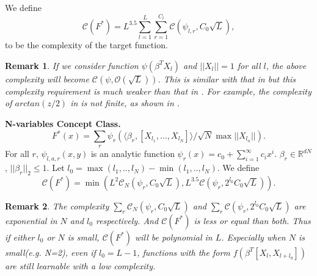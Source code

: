 \documentclass{article}
\newcommand{\cO}{\mathcal{O}}
\newtheorem{rem}{\textbf{Remark}}[section]
\begin{document}
We define
\begin{equation}\label{com1}
\mathscr{C}(F^*)=L^{3.5}\sum_{l=1}^L \sum_{r=1}^{C_l} \mathscr{C}(\psi_{l,r},C_0\sqrt{ L}),
\end{equation}
to be the complexity of the target function.
\begin{rem}
If we consider function $\psi(\beta^TX_l)$ and $||X_l||=1$ for all $l$, the above complexity will become  $\mathscr{C}(\psi,\cO(\sqrt{L}))$. This is similar with that in \cite{allenzhu2019sgd} but this complexity requirement is much weaker than that in \cite{allenzhu2019sgd}. For example, the complexity of $arctan(z/2)$ in \cite{allenzhu2019sgd} is not finite, as shown in \cite{sa}.
\end{rem}
{\bf N-variables Concept Class.}
\begin{equation}\label{cop2}
F^*(x)=\sum_{r}\psi_{r}(\langle \beta_{r}, [X_{l_1},...,X_{l_{N}}]\rangle/\sqrt{N}\max ||X_{l_n}||).
\end{equation}
For all $r$, $\psi_{l,a,r}(x,y)$ is an analytic  function $\psi_{r}(x)=c_0+ \sum_{i=1}^\infty c_ix^{i}$. $\beta_{r}\in \mathbb{R}^{dN}$, $||\beta_{r}||_2\leq 1$. Let $l_0=\max(l_1,..,l_N)-\min(l_1,..,l_N)$.
We define
\begin{equation}\label{com2}
\mathscr{C}(F^*)=\min(L^{2}\mathscr{C}_N(\psi_{r},C_0\sqrt{ L}), L^{3.5}\mathscr{C}(\psi_{r},2^{l_0}C_0\sqrt{ L})).
\end{equation}
\begin{rem}
The complexity $\sum_{r} \mathscr{C}_N(\psi_{r},C_0\sqrt{ L})$ and $\sum_{r}\mathscr{C}(\psi_{r},2^{l_0}C_0\sqrt{ L})$ are exponential in $N$ and $l_0$ respectively. And $\mathscr{C}(F^*)$ is less or equal than both. Thus if either $l_0$ or $N$ is small, $\mathscr{C}(F^*)$ will be polynomial in $L$. Especially when $N$ is small(e.g. N=2), even if $l_0=L-1$, functions with the form $f(\beta^T[X_l,X_{l+l_0}])$ are still learnable with a low complexity.
\end{rem}
\end{document}
